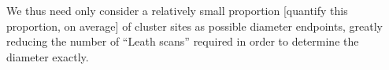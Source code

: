 \documentclass[aps, preprint, groupedaddress]{revtex4-1}
\begin{document}


We thus need only consider a relatively small proportion [quantify this proportion, on average] of cluster sites as possible diameter endpoints, greatly reducing the number of ``Leath scans'' required in order to determine the diameter exactly.
\end{document}
